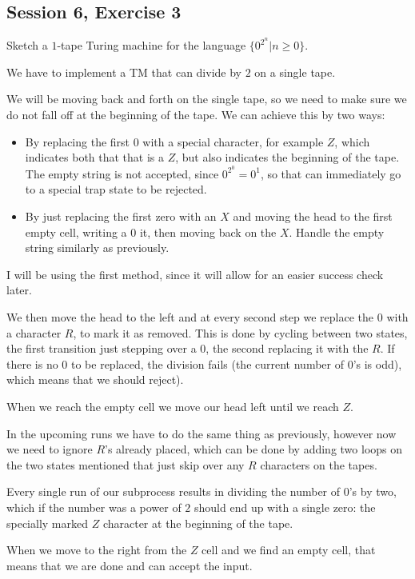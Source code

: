 \subsection {Session 6, Exercise 3}


Sketch a $1$-tape Turing machine for the language $\{0^{2^n} | n \geq{} 0\}$.


We have to implement a TM that can divide by $2$ on a single tape.

We will be moving back and forth on the single tape, so we need to make sure we do not fall off
at the beginning of the tape. We can achieve this by two ways:

\begin{itemize}
    \item By replacing the first $0$ with a special character, for example $Z$, which indicates both that that is a $Z$, but also indicates the beginning of the tape. The empty string is not accepted, since $0^{2^0} = 0^1$, so that can immediately go to a special trap state to be rejected.
    \item By just replacing the first zero with an $X$ and moving the head to the first empty cell, writing a $0$ it, then moving back on the $X$. Handle the empty string similarly as previously.
\end{itemize}

I will be using the first method, since it will allow for an easier success check later.

We then move the head to the left and at every second step we replace the $0$ with a character $R$, to mark it as removed. This is done by cycling between two states, the first transition just stepping over a $0$, the second replacing it with the $R$. If there is no $0$ to be replaced, the division fails (the current number of $0$'s is odd), which means that we should reject).

When we reach the empty cell we move our head left until we reach $Z$.

In the upcoming runs we have to do the same thing as previously, however now we need to ignore $R$'s already placed, which can be done by adding two loops on the two states mentioned that just skip over any $R$ characters on the tapes.

Every single run of our subprocess results in dividing the number of $0$'s by two, which if the number was a power of $2$ should end up with a single zero: the specially marked $Z$ character at the beginning of the tape.

When we move to the right from the $Z$ cell and we find an empty cell, that means that we are done and can accept the input.
